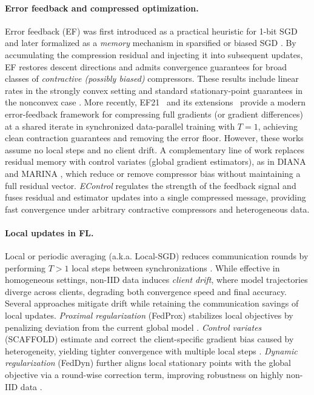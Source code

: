 \documentclass{article} %
\begin{document}
\paragraph{Error feedback and compressed optimization.}
Error feedback (EF) was first introduced as a practical heuristic for 1-bit SGD~\citep{seide2014onebit} and later formalized as a \emph{memory} mechanism in sparsified or biased SGD \citep{stich2018sparsified,karimireddy2019error}. By accumulating the compression residual and injecting it into subsequent updates, EF restores descent directions and admits convergence guarantees for broad classes of \emph{contractive (possibly biased)} compressors. These results include linear rates in the strongly convex setting and standard stationary-point guarantees in the nonconvex case \citep{gorbunov2020linearly,beznosikov2023biased}. More recently, EF21~\citep{richtarik2021ef21} and its extensions~\citep{fatkhullin2025ef21bells} provide a modern error-feedback framework for compressing full gradients (or gradient differences) at a shared iterate in synchronized data-parallel training with $T{=}1$, achieving clean contraction guarantees and removing the error floor. However, these works assume no local steps and no client drift. 
A complementary line of work replaces residual memory with control variates (global gradient estimators), as in DIANA and MARINA \citep{mishchenko2019distributed,gorbunov2021marina}, which reduce or remove compressor bias without maintaining a full residual vector. \emph{EControl} \citep{gao2024econtrol} regulates the strength of the feedback signal and fuses residual and estimator updates into a single compressed message, providing fast convergence under arbitrary contractive compressors and heterogeneous data.

\paragraph{Local updates in FL.}
Local or periodic averaging (a.k.a. Local-SGD) reduces communication rounds by performing $T>1$ local steps between synchronizations \citep{stich2018local}. While effective in homogeneous settings, non-IID data induces \emph{client drift}, where model trajectories diverge across clients, degrading both convergence speed and final accuracy. Several approaches mitigate drift while retaining the communication savings of local updates. \emph{Proximal regularization} (FedProx) stabilizes local objectives by penalizing deviation from the current global model \citep{li2020federated}. \emph{Control variates} (SCAFFOLD) estimate and correct the client-specific gradient bias caused by heterogeneity, yielding tighter convergence with multiple local steps \citep{karimireddy2020scaffold}. \textit{Dynamic regularization} (FedDyn) further aligns local stationary points with the global objective via a round-wise correction term, improving robustness on highly non-IID data \citep{acar2021federated}.
\end{document}
